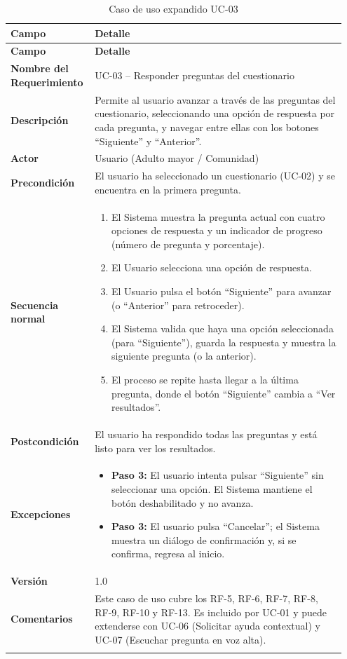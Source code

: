 \begin{longtable}{p{0.22\linewidth} p{0.73\linewidth}}
\toprule
\rowcolor{tableheader!20}
\textbf{Campo} & \textbf{Detalle} \\
\midrule
\endfirsthead
\rowcolor{tableheader!20}
\textbf{Campo} & \textbf{Detalle} \\
\midrule
\endhead
\bottomrule
\endfoot
\textbf{Nombre del Requerimiento} & UC-03 -- Responder preguntas del cuestionario \\
\textbf{Descripción} & Permite al usuario avanzar a través de las preguntas del cuestionario, seleccionando una opción de respuesta por cada pregunta, y navegar entre ellas con los botones ``Siguiente'' y ``Anterior''. \\
\textbf{Actor} & Usuario (Adulto mayor / Comunidad) \\
\textbf{Precondición} & El usuario ha seleccionado un cuestionario (UC-02) y se encuentra en la primera pregunta. \\
\textbf{Secuencia normal} & 
  \begin{enumerate}
    \item El Sistema muestra la pregunta actual con cuatro opciones de respuesta y un indicador de progreso (número de pregunta y porcentaje).
    \item El Usuario selecciona una opción de respuesta.
    \item El Usuario pulsa el botón ``Siguiente'' para avanzar (o ``Anterior'' para retroceder).
    \item El Sistema valida que haya una opción seleccionada (para ``Siguiente''), guarda la respuesta y muestra la siguiente pregunta (o la anterior).
    \item El proceso se repite hasta llegar a la última pregunta, donde el botón ``Siguiente'' cambia a ``Ver resultados''.
  \end{enumerate} \\
\textbf{Postcondición} & El usuario ha respondido todas las preguntas y está listo para ver los resultados. \\
\textbf{Excepciones} & 
  \begin{itemize}
    \item \textbf{Paso 3:} El usuario intenta pulsar ``Siguiente'' sin seleccionar una opción. El Sistema mantiene el botón deshabilitado y no avanza.
    \item \textbf{Paso 3:} El usuario pulsa ``Cancelar''; el Sistema muestra un diálogo de confirmación y, si se confirma, regresa al inicio.
  \end{itemize} \\
\textbf{Versión} & 1.0 \\
\textbf{Comentarios} & Este caso de uso cubre los RF-5, RF-6, RF-7, RF-8, RF-9, RF-10 y RF-13. Es incluido por UC-01 y puede extenderse con UC-06 (Solicitar ayuda contextual) y UC-07 (Escuchar pregunta en voz alta). \\
\bottomrule
\caption{Caso de uso expandido UC-03}
\label{tab:uc03}
\end{longtable}

